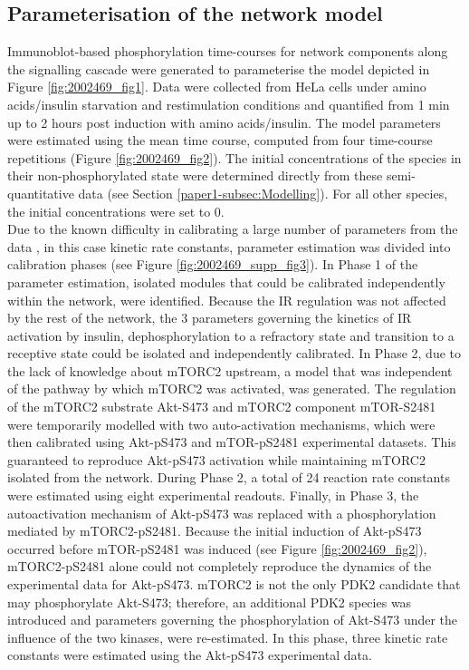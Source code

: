 \subsection{Parameterisation of the network model}
\label{paper1-subsec:Parameterisation of the network model}
Immunoblot-based phosphorylation time-courses for network components along the signalling cascade were generated to parameterise the model depicted in Figure \ref{fig:2002469_fig1}. Data were collected from HeLa cells under amino acids/insulin starvation and restimulation conditions and quantified from 1 min up to 2 hours post induction with amino acids/insulin. The model parameters were estimated using the mean time course, computed from four time-course repetitions (Figure \ref{fig:2002469_fig2}). The initial concentrations of the species in their non-phosphorylated state were determined directly from these semi-quantitative data (see Section \ref{paper1-subsec:Modelling}). For all other species, the initial concentrations were set to 0. \\
Due to the known difficulty in calibrating a large number of parameters from the data \citep{Chen2010, Moles2003, Zhan2011}, in this case kinetic rate constants, parameter estimation was divided into calibration phases (see Figure \ref{fig:2002469_supp_fig3}). In Phase 1 of the parameter estimation, isolated modules that could be calibrated independently within the network, were identified. Because the IR regulation was not affected by the rest of the network, the 3 parameters governing the kinetics of IR activation by insulin, dephosphorylation to a refractory state and transition to a receptive state could be isolated and independently calibrated. In Phase 2, due to the lack of knowledge about mTORC2 upstream, a model that was independent of the pathway by which mTORC2 was activated, was generated. The regulation of the mTORC2 substrate Akt-S473 and mTORC2 component mTOR-S2481 were temporarily modelled with two auto-activation mechanisms, which were then calibrated using Akt-pS473 and mTOR-pS2481 
experimental datasets. This guaranteed to reproduce Akt-pS473 activation while maintaining mTORC2 isolated from the network. During Phase 2, a total of 24 reaction rate constants were estimated using eight experimental readouts. Finally, in Phase 3, the autoactivation mechanism of Akt-pS473 was replaced with a phosphorylation mediated by mTORC2-pS2481. Because the initial induction of Akt-pS473 occurred before mTOR-pS2481 was induced (see Figure \ref{fig:2002469_fig2}), mTORC2-pS2481 alone could not completely reproduce the dynamics of the experimental data for Akt-pS473. mTORC2 is not the only PDK2 candidate that may phosphorylate Akt-S473; therefore, an additional PDK2 species was introduced and parameters governing the phosphorylation of Akt-S473 under the influence of the two kinases, were re-estimated. In this phase, three kinetic rate constants were estimated using the Akt-pS473 experimental data. \\
